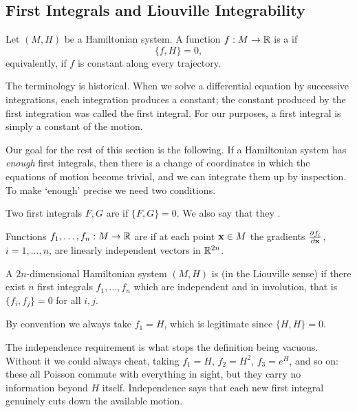 \documentclass[a4paper]{scrartcl}
\begin{document}
\subsection{First Integrals and Liouville Integrability}

\begin{definition}
	Let $(M, H)$ be a Hamiltonian system. A function $f : M \to \mathbb{R}$ is a  if
	$$
	\{f, H\} = 0,
	$$
	equivalently, if $f$ is constant along every trajectory.
\end{definition}

The terminology is historical. When we solve a differential equation by successive integrations, each integration produces a constant; the constant produced by the first integration was called the first integral. For our purposes, a first integral is simply a constant of the motion.

Our goal for the rest of this section is the following. If a Hamiltonian system has \emph{enough} first integrals, then there is a change of coordinates in which the equations of motion become trivial, and we can integrate them up by inspection. To make `enough' precise we need two conditions.

\begin{definition}[Involution]
	Two first integrals $F, G$ are  if $\{F, G\} = 0$. We also say that they .
\end{definition}

\begin{definition}[Independence]
	Functions $f_1, \dots, f_n : M \to \mathbb{R}$ are  if at each point $\mathbf{x} \in M$ the gradients $\frac{\partial f_i}{\partial \mathbf{x}}$, $i = 1,\dots, n$, are linearly independent vectors in $\mathbb{R}^{2n}$.
\end{definition}

\begin{definition}
	A $2n$-dimensional Hamiltonian system $(M, H)$ is  (in the Liouville sense) if there exist $n$ first integrals $f_1, \dots, f_n$ which are independent and in involution, that is $\{f_i, f_j\} = 0$ for all $i,j$.
\end{definition}

By convention we always take $f_1 = H$, which is legitimate since $\{H, H\} = 0$.

The independence requirement is what stops the definition being vacuous. Without it we could always cheat, taking $f_1 = H$, $f_2 = H^2$, $f_3 = e^H$, and so on: these all Poisson commute with everything in sight, but they carry no information beyond $H$ itself. Independence says that each new first integral genuinely cuts down the available motion.
\end{document}
